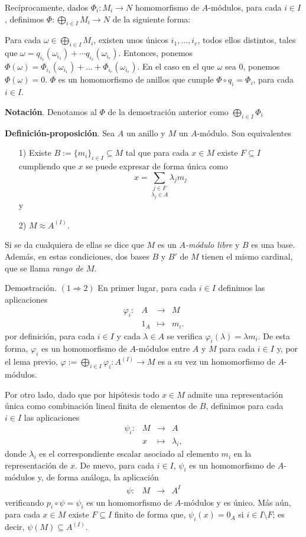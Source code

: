 \documentclass[a4paper,12pt]{article}
\begin{document}
Recíprocamente, dados $\Phi_i:M_i\rightarrow N$ homomorfismo de $A$-módulos, para cada $i\in I$, definimos $\Phi:\bigoplus_{i\in I} M_i\rightarrow N$ de la siguiente forma:

Para cada $\omega \in \bigoplus_{i\in I} M_i$, existen unos únicos $i_1,...,i_r$, todos ellos distintos, tales que $\omega=q_{i_1}(\omega_{i_1})+\cdots q_{i_r}(\omega_{i_r})$. Entonces, ponemos $\Phi(\omega)=\Phi_{i_1}(\omega_{i_1})+...+\Phi_{i_r}(\omega_{i_r})$. En el caso en el que $\omega$ sea $0$, ponemos $\Phi(\omega)=0$. $\Phi$ es un homomorfismo de anillos que cumple $\Phi\circ q_i = \Phi_i$, para cada $i\in I$.

\textbf{Notación}. Denotamos al $\Phi$ de la demostración anterior como $\bigoplus_{i\in I} \Phi_i$

\textbf{Definición-proposición}. Sea $A$ un anillo y $M$ un $A$-módulo. Son equivalentes
\begin{itemize}
    \item[1)] Existe $B:={\{m_i\}}_{i\in I}\subseteq M$ tal que para cada $x\in M$ existe $F\subseteq I$ cumpliendo que $x$ se puede expresar de forma única como$$x=\underset{\lambda_j\in A}{\sum_{j\in F}}\lambda_j m_j$$ y
    \item[2)] $M\approx A^{(I)}$.
\end{itemize}
Si se da cualquiera de ellas se dice que $M$ es un \textit{$A$-módulo libre} y $B$ es una base. Además, en estas condiciones, dos bases $B$ y $B'$ de $M$ tienen el mismo cardinal, que se llama \textit{rango de $M$}.

Demostración. $(1\Rightarrow 2)$ En primer lugar, para cada $i\in I$ definimos las aplicaciones
$$\begin{array}{rccl}
    \varphi_i:&A&\longrightarrow&M\\
    &1_A&\longmapsto&m_i.
\end{array}$$
por definición, para cada $i\in I$ y cada $\lambda\in A$ se verifica $\varphi_i(\lambda)=\lambda m_i$.
De esta forma, $\varphi_i$ es un homomorfismo de $A$-módulos entre $A$ y $M$ para cada $i\in I$ y, por el lema previo, $\varphi:=\bigoplus_{i\in I}\varphi_i: A^{(I)}\longrightarrow M$ es a su vez un homomorfismo de $A$-módulos.

Por otro lado, dado que por hipótesis todo $x\in M$ admite una representación única como combinación lineal finita de elementos de $B$, definimos para cada $i\in I$ las aplicaciones
$$\begin{array}{rccl}
    \psi_i:&M&\longrightarrow&A\\
    &x&\longmapsto&\lambda_i,
\end{array}$$
donde $\lambda_i$ es el correspondiente escalar asociado al elemento $m_i$ en la representación de $x$. De nuevo, para cada $i\in I$, $\psi_i$ es un homomorfismo de $A$-módulos y, de forma análoga, la aplicación
$$\begin{array}{rccl}
    \psi:&M&\longrightarrow&A^I
\end{array}$$
verificando $p_i\circ\psi=\psi_i$ es un homomorfismo de $A$-módulos y es único. Más aún, para cada $x\in M$ existe $F\subseteq I$ finito de forma que, $\psi_i(x)=0_A$ si $i\in I\setminus F$; es decir, $\psi(M)\subseteq A^{(I)}$.
\end{document}
